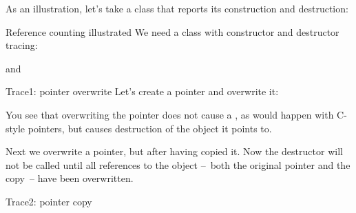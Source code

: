 As an illustration, let's take a class that reports its construction
and destruction:
%
\begin{block}{Reference counting illustrated}
  \label{sl:construct-destruct-trace}
  We need a class with constructor and destructor tracing:
\end{block}

%
and
\begin{block}{Trace1: pointer overwrite}
  \label{sl:shared-ptr-overwrite}
  Let's create a pointer and overwrite it:
\end{block}
%
You see that overwriting the pointer does not cause a
, as would happen with C-style pointers, but
causes destruction of the object it points to.

Next we overwrite a pointer, but after having copied it. Now the
destructor will not be called until all references to the object
--~both the original pointer and the copy~-- have been overwritten.
%
\begin{block}{Trace2: pointer copy}
  \label{sl:shared-ptr-copy}
\end{block}

\endinput

\verbatimsnippet{shareptr1}
creates an object and overwrites the pointer, causing the object to be
destroyed:
\begin{verbatim}
set pointer1
calling constructor
overwrite pointer
calling destructor
\end{verbatim}

Illustrating how the object is not destroyed until all references are
gone:
%
\verbatimsnippet{shareptr2}
gives:
\begin{verbatim}
set pointer2
calling constructor
set pointer3 by copy
overwrite pointer2
overwrite pointer3
calling destructor
\end{verbatim}
